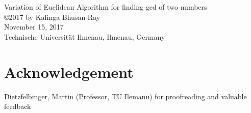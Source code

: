 \documentclass[12pt]{article}
\begin{document}
\begin{center}
{\large Variation of Euclidean Algorithm for finding gcd of two numbers} \\
\copyright 2017 by Kalinga Bhusan Ray \\
November 15, 2017 \\
Technische Universität Ilmenau, Ilmenau, Germany \\
\author{Kalinga Bhusan Ray}
\end{center}

\section*{Acknowledgement}
Dietzfelbinger, Martin (Professor, TU Ilemanu) for proofreading and valuable feedback

\quad
\end{document}
